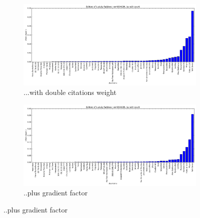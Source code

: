 \begin{figure}[H]
  
  \begin{subfigure}[b]{0.7\linewidth}
    \centering
    \includegraphics[width=\linewidth]{img/weightings/LudvigFaddeevCitations.png}
    \caption{...with double citations weight}
  \end{subfigure}
  \begin{subfigure}[b]{0.7\linewidth}
    \centering
    \includegraphics[width=\linewidth]{img/weightings/LudvigFaddeevCitationsGradient.png}
    \caption{..plus gradient factor}
  \end{subfigure}
  

\end{figure}
\clearpage
